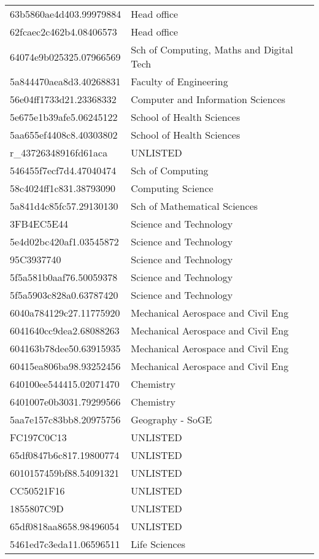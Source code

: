 \begin{tabular}{ll}
63b5860ae4d403.99979884 & Head office \\
62fcaec2c462b4.08406573 & Head office \\
64074e9b025325.07966569 & Sch of Computing, Maths and Digital Tech \\
5a844470aea8d3.40268831 & Faculty of Engineering \\
56e04ff1733d21.23368332 & Computer and Information Sciences \\
5e675e1b39afe5.06245122 & School of Health Sciences \\
5aa655ef4408c8.40303802 & School of Health Sciences \\
r_43726348916fd61aca & UNLISTED \\
546455f7ecf7d4.47040474 & Sch of Computing \\
58c4024ff1c831.38793090 & Computing Science \\
5a841d4c85fc57.29130130 & Sch of Mathematical Sciences \\
3FB4EC5E44 & Science and Technology \\
5e4d02bc420af1.03545872 & Science and Technology \\
95C3937740 & Science and Technology \\
5f5a581b0aaf76.50059378 & Science and Technology \\
5f5a5903c828a0.63787420 & Science and Technology \\
6040a784129c27.11775920 & Mechanical Aerospace and Civil Eng \\
6041640cc9dea2.68088263 & Mechanical Aerospace and Civil Eng \\
604163b78dee50.63915935 & Mechanical Aerospace and Civil Eng \\
60415ea806ba98.93252456 & Mechanical Aerospace and Civil Eng \\
640100ee544415.02071470 & Chemistry \\
6401007e0b3031.79299566 & Chemistry \\
5aa7e157c83bb8.20975756 & Geography - SoGE \\
FC197C0C13 & UNLISTED \\
65df0847b6c817.19800774 & UNLISTED \\
6010157459bf88.54091321 & UNLISTED \\
CC50521F16 & UNLISTED \\
1855807C9D & UNLISTED \\
65df0818aa8658.98496054 & UNLISTED \\
5461ed7c3eda11.06596511 & Life Sciences \\

\end{tabular}
